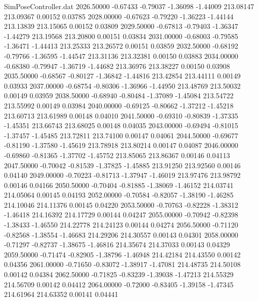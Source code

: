 \begin{filecontents}{SimPoseController.dat}
2026.50000   -0.67433   -0.79037    -1.36098   -1.44009  213.08147  213.09367    0.00152    0.03785
2028.00000   -0.67623   -0.79220    -1.36223   -1.44144  213.13839  213.15065    0.00152    0.03809
2029.50000   -0.67813   -0.79403    -1.36347   -1.44279  213.19568  213.20800    0.00151    0.03834
2031.00000   -0.68003   -0.79585    -1.36471   -1.44413  213.25333  213.26572    0.00151    0.03859
2032.50000   -0.68192   -0.79766    -1.36595   -1.44547  213.31136  213.32381    0.00150    0.03883
2034.00000   -0.68380   -0.79947    -1.36719   -1.44682  213.36976  213.38227    0.00150    0.03908
2035.50000   -0.68567   -0.80127    -1.36842   -1.44816  213.42854  213.44111    0.00149    0.03933
2037.00000   -0.68754   -0.80306    -1.36966   -1.44950  213.48769  213.50032    0.00149    0.03959
2038.50000   -0.68940   -0.80484    -1.37089   -1.45084  213.54722  213.55992    0.00149    0.03984
2040.00000   -0.69125   -0.80662    -1.37212   -1.45218  213.60713  213.61989    0.00148    0.04010
2041.50000   -0.69310   -0.80839    -1.37335   -1.45351  213.66743  213.68025    0.00148    0.04035
2043.00000   -0.69494   -0.81015    -1.37457   -1.45485  213.72811  213.74100    0.00147    0.04061
2044.50000   -0.69677   -0.81190    -1.37580   -1.45619  213.78918  213.80214    0.00147    0.04087
2046.00000   -0.69860   -0.81365    -1.37702   -1.45752  213.85065  213.86367    0.00146    0.04113
2047.50000   -0.70042   -0.81539    -1.37825   -1.45885  213.91250  213.92560    0.00146    0.04140
2049.00000   -0.70223   -0.81713    -1.37947   -1.46019  213.97476  213.98792    0.00146    0.04166
2050.50000   -0.70404   -0.81885    -1.38069   -1.46152  214.03741  214.05064    0.00145    0.04193
2052.00000   -0.70584   -0.82057    -1.38190   -1.46285  214.10046  214.11376    0.00145    0.04220
2053.50000   -0.70763   -0.82228    -1.38312   -1.46418  214.16392  214.17729    0.00144    0.04247
2055.00000   -0.70942   -0.82398    -1.38433   -1.46550  214.22778  214.24123    0.00144    0.04274
2056.50000   -0.71120   -0.82568    -1.38554   -1.46683  214.29206  214.30557    0.00143    0.04301
2058.00000   -0.71297   -0.82737    -1.38675   -1.46816  214.35674  214.37033    0.00143    0.04329
2059.50000   -0.71474   -0.82905    -1.38796   -1.46948  214.42184  214.43550    0.00142    0.04356
2061.00000   -0.71650   -0.83072    -1.38917   -1.47081  214.48735  214.50108    0.00142    0.04384
2062.50000   -0.71825   -0.83239    -1.39038   -1.47213  214.55329  214.56709    0.00142    0.04412
2064.00000   -0.72000   -0.83405    -1.39158   -1.47345  214.61964  214.63352    0.00141    0.04441

\end{filecontents}

